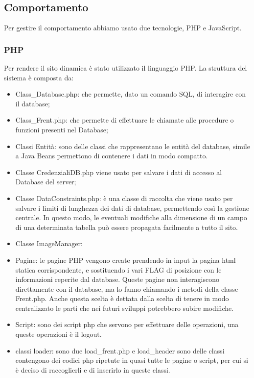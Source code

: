 \documentclass[1_relazione.tex]{subfiles}
\begin{document}
    \subsection{Comportamento}
    Per gestire il comportamento abbiamo usato due tecnologie, PHP e JavaScript.

\subsubsection{PHP}
Per rendere il sito dinamica \`{e} stato utilizzato il linguaggio PHP.
La struttura del sistema \`{e} composta da:
\begin{itemize}
    \item Class\_Database.php: che permette, dato un comando SQL, di interagire con il database;
    \item Class\_Frent.php: che permette di effettuare le chiamate alle procedure o funzioni presenti nel Database;
    \item Classi Entit\`{a}: sono delle classi che rappresentano le entit\`{a} del database, simile a Java Beans permettono di contenere i dati in modo compatto.
    \item Classe CredenzialiDB.php viene usato per salvare i dati di accesso al Database del server;
    \item Classe DataConstraints.php: \`{e} una classe di raccolta che viene usato per salvare i limiti di lunghezza dei dati di database, permettendo cos\`{i} la gestione centrale. In questo modo, le eventuali modifiche alla dimensione di un campo di una determinata tabella pu\`{o} essere propagata facilmente a tutto il sito.
    \item Classe ImageManager: %
    \item Pagine: le pagine PHP vengono create prendendo in input la pagina html statica corrispondente, e  sostituendo i vari FLAG di posizione con le informazioni reperite dal database. Queste pagine non interagiscono direttamente con il database, ma lo fanno chiamando i metodi della classe Frent.php. Anche questa scelta \`{e} dettata dalla scelta di tenere in modo centralizzato le parti che nei futuri sviluppi potrebbero subire modifiche.
    \item  Script: sono dei script php che servono per effettuare delle operazioni, una queste operazioni \`{e} il logout.
    \item classi loader: sono due load\_frent.php e load\_header sono delle classi contengono dei codici php ripetute in quasi tutte le pagine o script, per cui si \`{e} deciso di raccoglierli e di inserirlo in queste classi.
\end{itemize}
\end{document}
